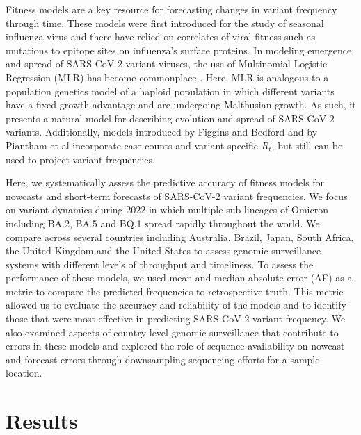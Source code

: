 \documentclass[11pt,oneside,letterpaper]{article}
\begin{document}
Fitness models are a key resource for forecasting changes in variant frequency through time.
These models were first introduced for the study of seasonal influenza virus \cite{luksza2014predictive, morris2018predictive, huddleston2020integrating} and there have relied on correlates of viral fitness such as mutations to epitope sites on influenza's surface proteins.
In modeling emergence and spread of SARS-CoV-2 variant viruses, the use of Multinomial Logistic Regression (MLR) has become commonplace \cite{annavajhala2021emergence, faria2021genomics, obermeyer2022analysis, susswein2023early}.
Here, MLR is analogous to a population genetics model of a haploid population in which different variants have a fixed growth advantage and are undergoing Malthusian growth.
As such, it presents a natural model for describing evolution and spread of SARS-CoV-2 variants.
Additionally, models introduced by Figgins and Bedford \cite{figgins2022sars} and by Piantham et al \cite{piantham2021estimating} incorporate case counts and variant-specific $R_t$, but still can be used to project variant frequencies.

Here, we systematically assess the predictive accuracy of fitness models for nowcasts and short-term forecasts of SARS-CoV-2 variant frequencies.
We focus on variant dynamics during 2022 in which multiple sub-lineages of Omicron including BA.2, BA.5 and BQ.1 spread rapidly throughout the world.
We compare across several countries including Australia, Brazil, Japan, South Africa, the United Kingdom and the United States to assess genomic surveillance systems with different levels of throughput and timeliness.
To assess the performance of these models, we used mean and median absolute error (AE) as a metric to compare the predicted frequencies to retrospective truth.
This metric allowed us to evaluate the accuracy and reliability of the models and to identify those that were most effective in predicting SARS-CoV-2 variant frequency.
We also examined aspects of country-level genomic surveillance that contribute to errors in these models and explored the role of sequence availability on nowcast and forecast errors through downsampling sequencing efforts for a sample location.

\section*{Results}
\end{document}
